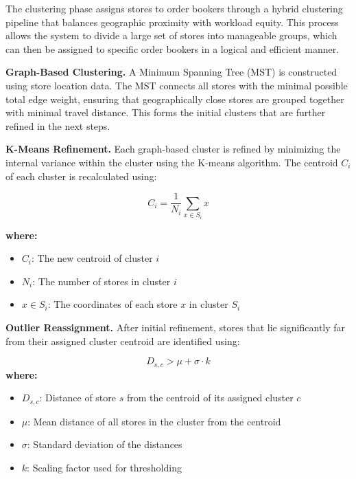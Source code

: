 The clustering phase assigns stores to order bookers through a hybrid clustering pipeline that balances geographic proximity with workload equity. This process allows the system to divide a large set of stores into manageable groups, which can then be assigned to specific order bookers in a logical and efficient manner.

\textbf{Graph-Based Clustering.} A Minimum Spanning Tree (MST) is constructed using store location data. The MST connects all stores with the minimal possible total edge weight, ensuring that geographically close stores are grouped together with minimal travel distance. This forms the initial clusters that are further refined in the next steps.

\textbf{K-Means Refinement.} Each graph-based cluster is refined by minimizing the internal variance within the cluster using the K-means algorithm. The centroid $C_i$ of each cluster is recalculated using:

\[
C_i = \frac{1}{N_i} \sum_{x \in S_i} x
\]

\textbf{where:}
\begin{itemize}
  \item $C_i$: The new centroid of cluster $i$
  \item $N_i$: The number of stores in cluster $i$
  \item $x \in S_i$: The coordinates of each store $x$ in cluster $S_i$
\end{itemize}

\textbf{Outlier Reassignment.} After initial refinement, stores that lie significantly far from their assigned cluster centroid are identified using:

\[
D_{s,c} > \mu + \sigma \cdot k
\]
\textbf{where:}
\begin{itemize}
  \item $D_{s,c}$: Distance of store $s$ from the centroid of its assigned cluster $c$ 
  \item $\mu$: Mean distance of all stores in the cluster from the centroid
  \item $\sigma$: Standard deviation of the distances
  \item $k$: Scaling factor used for thresholding
\end{itemize}

